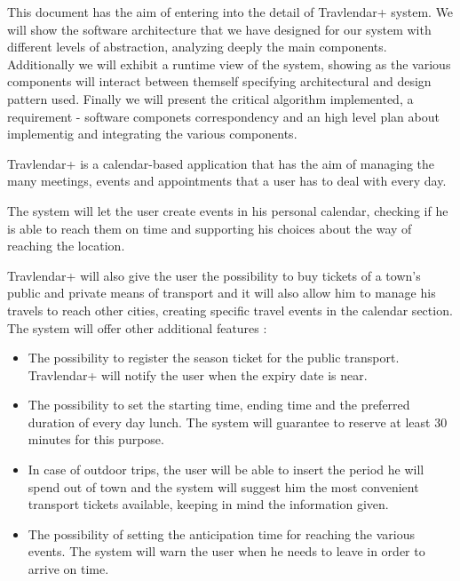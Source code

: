 \vspace*{-5mm}

This document has the aim of entering into the detail of Travlendar+ system. 
We will show the software architecture that we have designed for our system with different levels of abstraction, analyzing deeply the main components. 
Additionally we will exhibit a runtime view of the system, showing as the various components will interact between themself specifying architectural and design pattern used.
Finally we will present the critical algorithm implemented, a requirement - software componets correspondency and an high level plan about implementig and integrating the various components.

Travlendar+ is a calendar-based application that has the aim of managing the many meetings, events and appointments that a user has to deal with every day.\par
The system will let the user create events in his personal calendar, checking if he is able to reach them on time and supporting his choices about the way of reaching the location. \par
Travlendar+ will also give the user the possibility to buy tickets of a town’s public and private means of transport and it will also allow him to manage his travels to reach other cities, creating specific travel events in the calendar section.
The system will offer other additional features :
\begin{itemize}
	\setlength{\leftskip}{0.5cm}
	\item The possibility to register the season ticket for the public transport. Travlendar+ will notify the user when the expiry date is near.
	\item The possibility to set the starting time, ending time and the preferred duration of every day lunch. The system will guarantee to reserve at least 30 minutes for this purpose.
	\item In case of outdoor trips, the user will be able to insert the period he will spend out of town and the system will suggest him the most convenient transport tickets available, keeping in mind the information given.
	\item The possibility of setting the anticipation time for reaching the various events. The system will warn the user when he needs to leave in order to arrive on time.
\end{itemize}






